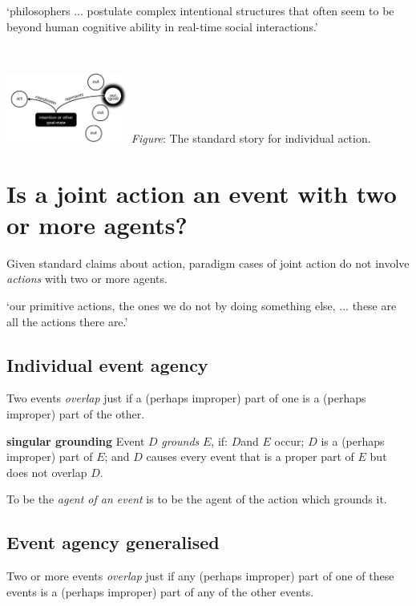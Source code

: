 \documentclass[11pt]{extarticle}
\begin{document}
\begin{multicols}{3}
`philosophers ... postulate complex intentional structures that often seem to be beyond human cognitive ability in real-time social interactions.'
\citep%
{Knoblich:2008hy}




\

\begin{center}
  \includegraphics[width=0.3\textwidth]{standard_story.png}
\emph{Figure}: The standard story for individual action.
\end{center}


\section{Is a joint action an event with two or more agents?\citep{ludwig_collective_2007}}

Given standard claims about action, paradigm cases of joint action do not involve \emph{actions} with two or more agents.

`our primitive actions, the ones we do not by doing something else, ... these are all the actions there are.'\citep%
{Davidson:1971fz}

\subsection{Individual event agency}
Two events \emph{overlap} just if a (perhaps improper) part of one is a (perhaps improper) part of the other.

\textbf{singular grounding} 
Event $D$ \emph{grounds} $E$, if: $D$and $E$ occur; 
$D$ is a (perhaps improper) part of $E$; and 
$D$ causes every event that is a proper part of $E$ but does not overlap $D$.

To be the \emph{agent of an event} is to be the agent of the action which grounds it.\citep%
{pietroski_actions_1998}


\subsection{Event agency generalised}
Two or more events \emph{overlap} just if any (perhaps improper) part of one of these events is a (perhaps improper) part of any of the other events.


\end{multicols}
\end{document}
